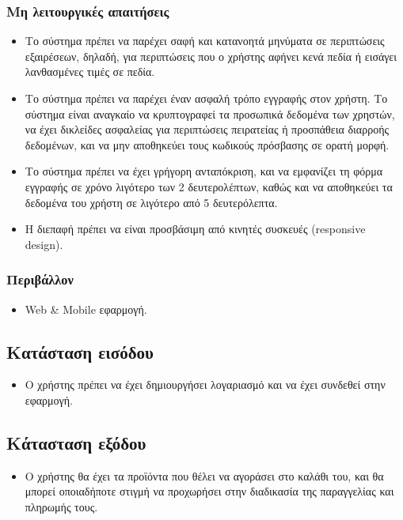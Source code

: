 \documentclass[12pt,a4paper,twoside]{book}
\begin{document}
\subsubsection{Μη λειτουργικές απαιτήσεις}
\begin{itemize}
  \item Το σύστημα πρέπει να παρέχει σαφή και κατανοητά μηνύματα σε περιπτώσεις εξαιρέσεων, δηλαδή, για περιπτώσεις που ο χρήστης αφήνει κενά πεδία ή εισάγει λανθασμένες τιμές σε πεδία.%
  \item Το σύστημα πρέπει να παρέχει έναν ασφαλή τρόπο εγγραφής στον χρήστη. Το σύστημα είναι αναγκαίο να κρυπτογραφεί τα προσωπικά δεδομένα των χρηστών, να έχει δικλείδες ασφαλείας για περιπτώσεις πειρατείας ή προσπάθεια διαρροής δεδομένων, και να μην αποθηκεύει τους κωδικούς πρόσβασης σε ορατή μορφή. %
  \item Το σύστημα πρέπει να έχει γρήγορη ανταπόκριση, και να εμφανίζει τη φόρμα εγγραφής σε χρόνο λιγότερο των 2 δευτερολέπτων, καθώς και να αποθηκεύει τα δεδομένα του χρήστη σε λιγότερο από 5 δευτερόλεπτα. %
  \item Η διεπαφή πρέπει να είναι προσβάσιμη από κινητές συσκευές (responsive design). %
\end{itemize}

\subsubsection{Περιβάλλον}
\begin{itemize}
  \item Web \& Mobile εφαρμογή.
\end{itemize}

\subsection{Κατάσταση εισόδου} %
\begin{itemize}
  \item Ο χρήστης πρέπει να έχει δημιουργήσει λογαριασμό και να έχει συνδεθεί στην εφαρμογή. %
\end{itemize}

\subsection{Κάτασταση εξόδου} %
\begin{itemize}
  \item Ο χρήστης θα έχει τα προϊόντα που θέλει να αγοράσει στο καλάθι του, και θα μπορεί οποιαδήποτε στιγμή να προχωρήσει στην διαδικασία της παραγγελίας και πληρωμής τους. %
\end{itemize}
\end{document}
